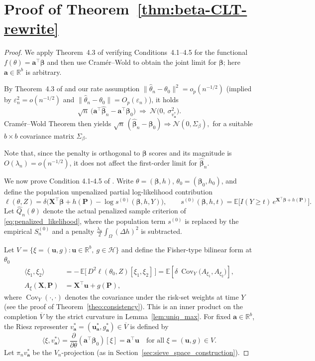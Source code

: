 \documentclass[11pt]{article}
\DeclareMathOperator{\Cov}{Cov}
\newcommand{\E}{\mathbb{E}}
\newcommand{\R}{\mathbb{R}}
\begin{document}
	
	
	
	
	\section{Proof of Theorem~\ref{thm:beta-CLT-rewrite}}\label{appendix:normality}
	\begin{proof}
		We apply Theorem~4.3 of \cite{chen2007large} verifying Conditions~4.1--4.5 for the functional $f(\theta)=\bm a^\top\bm\beta$ and then use Cramér--Wold to obtain the joint limit for $\bm\beta$; here $\bm a\in\mathbb R^b$ is arbitrary.  
		
		By Theorem~4.3 of \cite{chen2007large} and our rate assumption $\|\hat\theta_n-\theta_0\|^{2}=o_p(n^{-1/2})$ (implied by $\varepsilon_n^2=o(n^{-1/2})$ and $\|\hat\theta_n-\theta_0\| = O_p(\varepsilon_n)$), it holds
		\[
		\sqrt n\ \big(\bm a^\top\hat{\bm\beta}_n-\bm a^\top\bm\beta_0\big)
		\ \Rightarrow\ \mathcal N\!\big(0,\ \sigma^2_{v_{\bm a}^*}\big).
		\]
		Cramér--Wold Theorem then yields
		\(
		\sqrt n\,(\hat{\bm\beta}_n-\bm\beta_0)\Rightarrow\mathcal N(0,\Sigma_\beta),
		\)
		for a suitable $b\times b$ covariance matrix $\Sigma_\beta$. 
		
		Note that, since the penalty is orthogonal to $\bm\beta$ scores and its magnitude is $O(\lambda_n)=o(n^{-1/2})$, it does not affect the first-order limit for $\hat{\bm\beta}_n$.
		
		We now prove Condition 4.1-4.5 of \cite{chen2007large}.  
		Write $\theta=(\bm\beta,h)$, $\theta_0=(\bm\beta_0,h_0)$, and define the population unpenalized partial log-likelihood contribution
		\[
		\ell(\theta,Z)
		=\delta\Big(\bm X^\top\bm\beta+h(\bm P)-\log s^{(0)}(\bm\beta,h,Y)\Big),
		\qquad
		s^{(0)}(\bm\beta,h,t)=\E\big[I(Y\ge t)\,e^{\bm X^\top\bm\beta+h(\bm P)}\big].
		\]
		Let $\hat Q_n(\theta)$ denote the actual penalized sample criterion of \eqref{eq:penalized_likelihood}, where the population term $s^{(0)}$ is replaced by the empirical $S_n^{(0)}$ and a penalty $\frac{\lambda_n}{2}\!\int_\Omega(\Delta h)^2$ is subtracted.
		
		
		Let $V=\{\xi=(\bm u,g):\bm u\in\R^b,\ g\in\mathcal H\}$ and define the Fisher-type bilinear form at $\theta_0$
        \begin{align*}
        \langle \xi_1,\xi_2\rangle
        &= -\,\E\big[\,D^2\ell(\theta_0,Z)[\xi_1,\xi_2]\,\big]
        = \E\!\left[\delta\ \Cov_Y\!\Big(A_{\xi_1},A_{\xi_2}\Big)\right],\\
        A_{\xi}(\bm X,\bm P) &= \bm X^\top\bm u + g(\bm P),
        \end{align*}
		where $\Cov_Y(\cdot,\cdot)$ denotes the covariance under the risk-set weights at time $Y$ (see the proof of Theorem~\ref{theo:consistency}). This is an inner product on the completion $\overline V$ by the strict curvature in Lemma~\ref{lem:uniq_max}. For fixed $\bm a\in\R^b$, the Riesz representer $v_{\bm a}^*=(\bm u_{\bm a}^*,g_{\bm a}^*)\in\overline V$ is defined by
		\[
		\langle \xi, v_{\bm a}^*\rangle
		= \frac{\partial}{\partial\theta}(\bm a^\top\bm\beta_0)[\xi]
		= \bm a^\top\bm u
		\quad\text{for all }\xi=(\bm u,g)\in V.
		\]
		Let $\pi_n v_{\bm a}^*$ be the $V_n$-projection (as in Section~\ref{sec:sieve_space_construction}).
		

\end{proof}
\end{document}
